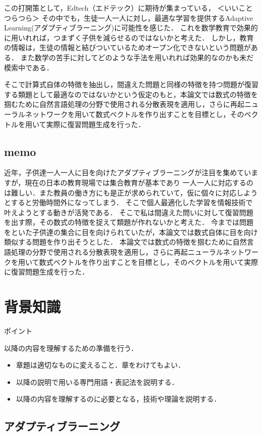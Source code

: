 \documentclass[a4j,11pt,report]{jsbook}
\newcommand{\point}[1]{
\begin{itembox}[l]{ポイント}
  #1
\end{itembox}
}
\begin{document}
この打開策として，Edtech（エドテック）に期待が集まっている，
＜いいことつらつら＞
その中でも，生徒一人一人に対し，最適な学習を提供するAdaptive Learning(アダプティブラーニング)に可能性を感じた．
これを数学教育で効果的に用いれれば，つまずく子供を減らせるのではないかと考えた．
しかし，教育の情報は，生徒の情報と結びついているためオープン化できないという問題がある．
また数学の苦手に対してどのような手法を用いれれば効果的なのかも未だ模索中である．

そこで計算式自体の特徴を抽出し，間違えた問題と同様の特徴を持つ問題が復習する類題として最適なのではないかという仮定のもと，本論文では数式の特徴を掴むために自然言語処理の分野で使用される分散表現を適用し，さらに再起ニューラルネットワークを用いて数式ベクトルを作り出すことを目標とし，そのベクトルを用いて実際に復習問題生成を行った．


\section{memo}
近年，子供達一人一人に目を向けたアダプティブラーニングが注目を集めていますが，現在の日本の教育現場では集合教育が基本であり
一人一人に対応するのは難しい．また教員の働き方にも是正が求められていて，仮に個々に対応しようとすると労働時間外になってしまう．
そこで個人最適化した学習を情報技術で叶えようとする動きが活発である．
そこで私は間違えた問いに対して復習問題を出す際，その数式の特徴を捉えて類題が作れないかと考えた．
今までは問題をといた子供達の集合に目を向けられていたが，本論文では数式自体に目を向け類似する問題を作り出そうとした．
本論文では数式の特徴を掴むために自然言語処理の分野で使用される分散表現を適用し，さらに再起ニューラルネットワークを用いて数式ベクトルを作り出すことを目標とし，そのベクトルを用いて実際に復習問題生成を行った．




\chapter{背景知識\label{ch:background}}

\point{
以降の内容を理解するための準備を行う．
\begin{itemize}
  \item 章題は適切なものに変えること．章をわけてもよい．
  \item 以降の説明で用いる専門用語・表記法を説明する．
  \item 以降の内容を理解するのに必要となる，技術や理論を説明する．
\end{itemize}
}


\section{アダプティブラーニング}
\end{document}
